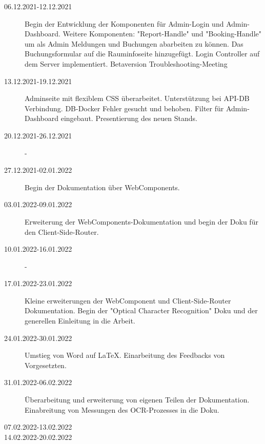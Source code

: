 \begin{description}
    \item[06.12.2021-12.12.2021] Begin der Entwicklung der Komponenten für Admin-Login und Admin-Dashboard. Weitere Komponenten: "Report-Handle" und "Booking-Handle" um als Admin Meldungen und Buchungen abarbeiten zu können. Das Buchungsformular auf die Rauminfoseite hinzugefügt. Login Controller auf dem Server implementiert. Betaversion Troubleshooting-Meeting
    \item[13.12.2021-19.12.2021] Adminseite mit flexiblem CSS überarbeitet. Unterstützung bei API-DB Verbindung. DB-Docker Fehler gesucht und behoben. Filter für Admin-Dashboard eingebaut. Presentierung des neuen Stands.
    \item[20.12.2021-26.12.2021] - 
    \item[27.12.2021-02.01.2022] Begin der Dokumentation über WebComponents.
    \item[03.01.2022-09.01.2022] Erweiterung der WebComponents-Dokumentation und begin der Doku für den Client-Side-Router.
    \item[10.01.2022-16.01.2022] - 
    \item[17.01.2022-23.01.2022] Kleine erweiterungen der WebComponent und Client-Side-Router Dokumentation. Begin der "Optical Character Recognition" Doku und der generellen Einleitung in die Arbeit. 
    \item[24.01.2022-30.01.2022] Umstieg von Word auf LaTeX. Einarbeitung des Feedbacks von Vorgesetzten. 
    \item[31.01.2022-06.02.2022] Überarbeitung und erweiterung von eigenen Teilen der Dokumentation. Einabreitung von Messungen des OCR-Prozesses in die Doku.
    \item[07.02.2022-13.02.2022]
    \item[14.02.2022-20.02.2022] 
\end{description}